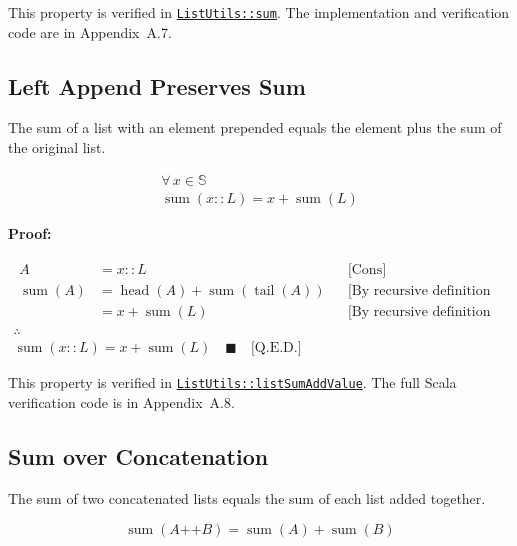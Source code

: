 This property is verified in
\href{https://github.com/thiagomata/prime-numbers/blob/list-article-v1.0.0/src/main/scala/v1/chapter3/list/ListUtils.scala}{\texttt{ListUtils::sum}}.
The implementation and verification code are in Appendix~A.7.

\subsection{Left Append Preserves Sum}

The sum of a list with an element prepended equals the element plus the
sum of the original list.

\begin{gather*}
\forall\, x \in \mathbb{S} \\
\operatorname{sum}(x :: L) = x + \operatorname{sum}(L)
\end{gather*}

\textbf{Proof:}

\begin{gather*}
\begin{aligned}
A & = x :: L && \text{[Cons]} \\
\operatorname{sum}(A) & = \operatorname{head}(A) + \operatorname{sum}(\operatorname{tail}(A)) && \text{[By recursive definition of sum]} \\
& = x + \operatorname{sum}(L) && \text{[By recursive definition of head and tail]}
\end{aligned} \\
\therefore \\
\operatorname{sum}(x :: L) = x + \operatorname{sum}(L) \quad \blacksquare \quad \text{[Q.E.D.]}
\end{gather*}

{\raggedright
This property is verified in
\href{https://github.com/thiagomata/prime-numbers/blob/list-article-v1.0.0/src/main/scala/v1/chapter3/list/ListUtils.scala}{\texttt{ListUtils::\allowbreak listSumAddValue}}.
The full Scala verification code is in Appendix~A.8.
\par}

\subsection{Sum over Concatenation}

The sum of two concatenated lists equals the sum of each list added
together.

\begin{equation*}
\operatorname{sum}(A \mathbin{\texttt{++}} B) = \operatorname{sum}(A) + \operatorname{sum}(B)
\end{equation*}

